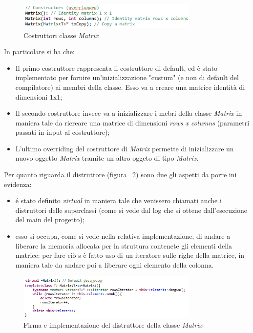 \begin{figure}[h]
	\centering
	\includegraphics[width=0.8\textwidth]{Immagini/MatrixConstructors.png}
	\caption{Costruttori classe \textit{Matrix}}
	\label{fig:matrixInit}
\end{figure}

In particolare si ha che:
\begin{itemize}
	\item Il primo costruttore rappresenta il costruttore di default, ed è stato implementato per fornire un'inizializzazione "custum" (e non di default del compilatore) ai membri della classe. Esso va a creare una matrice identità di dimensioni 1x1;
	\item Il secondo costruttore invece va a inizializzare i mebri della classe \textit{Matrix} in maniera tale da ricreare una matrice di dimensioni \textit{rows x columns} (parametri passati in input al costruttore);
	\item L'ultimo overriding del costruttore di \textit{Matrix} permette di inizializzare un nuovo oggetto \textit{Matrix} tramite un altro oggeto di tipo \textit{Matrix}.
\end{itemize}

Per quanto riguarda il distruttore (figura ~\ref{fig:matrixDeInit}) sono due gli aspetti da porre ini evidenza:
\begin{itemize}
	\item é stato definito \textit{virtual} in maniera tale che venissero chiamati anche i distruttori delle superclassi (come si vede dal log che si ottene dall'esecuzione del main del progetto);
	\item esso si occupa, come si vede nella relativa implementazione, di andare a liberare la memoria allocata per la struttura contenete gli elementi della matrice: per fare ciò s è fatto uso di un iteratore sulle righe della matrice, in maniera tale da andare poi a liberare ogni elemento della colonna.
\end{itemize}

\begin{figure}[h]
	\centering
	\includegraphics[width=0.8\textwidth]{Immagini/MatrixDestructors.png}
	\caption{Firma e implementazione del distruttore della classe \textit{Matrix}}
	\label{fig:matrixDeInit}
\end{figure}

